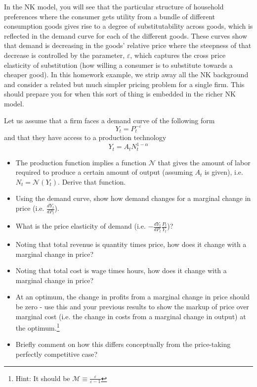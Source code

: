 \documentclass[authoryear,11pt]{elsarticle}
\begin{document}
In the NK model, you will see that the particular structure of household preferences where the consumer gets utility from a bundle of different consumption goods gives rise to a degree of substitutability across goods, which is reflected in the demand curve for each of the different goods. These curves show that demand is decreasing in the goods' relative price where the steepness of that decrease is controlled by the parameter, $\varepsilon$, which captures the cross price elasticity of substitution (how willing a consumer is to substitute towards a cheaper good). In this homework example, we strip away all the NK background and consider a related but much simpler pricing problem for a single firm. This should prepare you for when this sort of thing is embedded in the richer NK model.

\vspace{5mm}
Let us assume that a firm faces a demand curve of the following form
\[
Y_{t} = P_{t}^{-\varepsilon}
\]
and that they have access to a production technology
\[
Y_{t} = A_{t}N_{t}^{1-\alpha}
\]

\begin{itemize}
\item	The production function implies a function $\mathcal{N}$ that gives the amount of labor required to produce a certain amount of output (assuming $A_{t}$ is given), i.e. $N_{t} = \mathcal{N}(Y_{t})$. Derive that function.
\item	Using the demand curve, show how demand changes for a marginal change in price (i.e. $\frac{dY_{t}}{dP_{t}}$).
\item	What is the price elasticity of demand (i.e. $-\frac{dY_{t}}{dP_{t}}\frac{P_{t}}{Y_{t}}$)?
\item	Noting that total revenue is quantity times price, how does it change with a marginal change in price?
\item	Noting that total cost is wage times hours, how does it change with a marginal change in price?
\item	At an optimum, the change in profits from a marginal change in price should be zero - use this and your previous results to show the markup of price over marginal cost (i.e. the change in costs from a marginal change in output) at the optimum.\footnote{Hint: It should be $\mathcal{M}\equiv \frac{\varepsilon}{\varepsilon-1}$}
\item	Briefly comment on how this differs conceptually from the price-taking perfectly competitive case?
\end{itemize}
\end{document}
